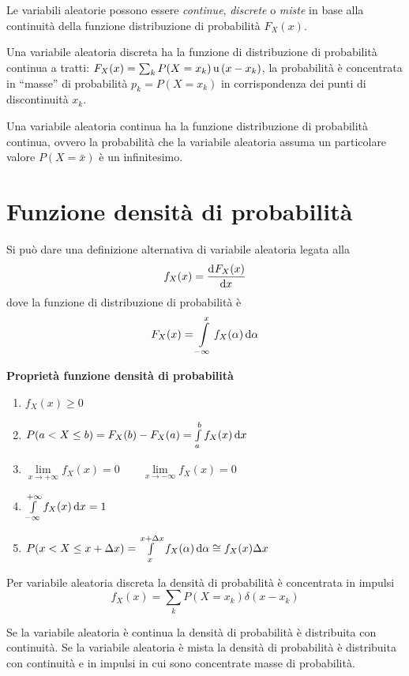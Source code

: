 Le variabili aleatorie possono essere \emph{continue}, \emph{discrete} o \emph{miste} in base alla continuità della funzione distribuzione di probabilità $F_X(x)$.

Una variabile aleatoria discreta ha la funzione di distribuzione di probabilità continua a tratti: $F_X(x)=\sum_k P(X=x_k)\operatorname{u}{(x-x_k)}$, la probabilità è concentrata in “masse” di probabilità $p_k=P(X=x_k)$ in corrispondenza dei punti di discontinuità $x_k$.

Una variabile aleatoria continua ha la funzione distribuzione di probabilità continua, ovvero la probabilità che la variabile aleatoria assuma un particolare valore $P(X=\bar{x})$ è un infinitesimo.

\section{Funzione densità di probabilità}
Si può dare una definizione alternativa di variabile aleatoria legata alla 
\begin{equation}\label{eq:funz_dens_prob}
f_X(x)=\dfrac{\mathop{}\!\mathrm{d}^{}F_X(x)}{\mathop{}\!\mathrm{d} x^{}}
\end{equation}
dove la funzione di distribuzione di probabilità è
\begin{equation}F_X(x)=\int\limits_{-\infty}^{x}{f_X(\alpha)}{\,\mathop{}\!\mathrm{d}{\alpha}}\end{equation}

\textbf{Proprietà funzione densità di probabilità}
\begin{enumerate}
\item $f_X(x)\geq 0$
\item $P(a<X\leq b)=F_X(b)-F_X(a)=\int\limits_{a}^{b}{f_X(x)}{\,\mathop{}\!\mathrm{d}{x}}$
\item $\lim\limits_{x\to+\infty}f_X(x)=0\qquad\lim\limits_{x\to-\infty}f_X(x)=0$
\item $\int\limits_{-\infty}^{+\infty}{f_X(x)}{\,\mathop{}\!\mathrm{d}{x}}=1$
\item $P(x<X\leq x+\Delta x)=\int\limits_{x}^{x+\Delta x}{f_X(\alpha)}{\,\mathop{}\!\mathrm{d}{\alpha}}\cong f_X(x)\Delta x$
\end{enumerate}

Per variabile aleatoria discreta la densità di probabilità è concentrata in impulsi
\begin{equation}f_X(x)=\sum_k P(X=x_k) \delta(x-x_k)\end{equation}

Se la variabile aleatoria è continua la densità di probabilità è distribuita con continuità.
Se la variabile aleatoria è mista la densità di probabilità è distribuita con continuità e in impulsi in cui sono concentrate masse di probabilità.

